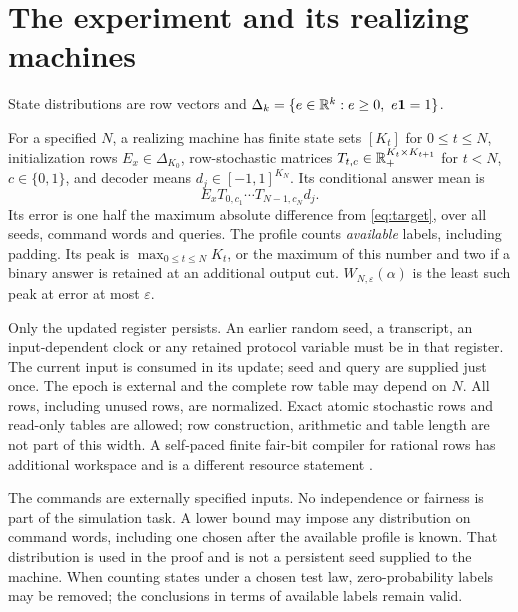 \section{The experiment and its realizing machines}\label{sec:model}
State distributions are row vectors and
$\Delta_k=\{e\in\mathbb R^k:e\ge0,\ e\mathbf1=1\}$.

\begin{definition}\label{def:machine}
For a specified $N$, a realizing machine has finite state sets $[K_t]$
for $0\le t\le N$, initialization rows $E_x\in\Delta_{K_0}$,
row-stochastic matrices $T_{t,c}\in\mathbb R_+^{K_t\times K_{t+1}}$ for
$t<N$, $c\in\{0,1\}$, and decoder means $d_j\in[-1,1]^{K_N}$.
Its conditional answer mean is
\[
 E_xT_{0,c_1}\cdots T_{N-1,c_N}d_j.
\]
Its error is one half the maximum absolute difference from
\eqref{eq:target}, over all seeds, command words and queries.
The profile counts \emph{available} labels, including padding. Its peak
is $\max_{0\le t\le N}K_t$, or the maximum of this number and two if
a binary answer is retained at an additional output cut.
$W_{N,\varepsilon}(\alpha)$ is the least such peak at error at most
$\varepsilon$.
\end{definition}

Only the updated register persists. An earlier random seed, a transcript,
an input-dependent clock or any retained protocol variable must be in
that register. The current input is consumed in its update; seed and
query are supplied just once. The epoch is external and the complete
row table may depend on $N$. All rows, including unused rows, are
normalized. Exact atomic stochastic rows and read-only tables are allowed;
row construction, arithmetic and table length are not part of this width.
A self-paced finite fair-bit compiler for rational rows has additional
workspace and is a different resource statement \cite{GTF31}.

The commands are externally specified inputs. No independence or fairness
is part of the simulation task. A lower bound may impose any distribution
on command words, including one chosen after the available profile is
known. That distribution is used in the proof and is not a persistent
seed supplied to the machine. When counting states under a chosen test
law, zero-probability labels may be removed; the conclusions in terms of
available labels remain valid.


